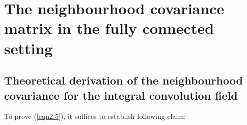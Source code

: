 \documentclass{article}
\begin{document}

\section{The neighbourhood covariance matrix in the fully connected setting\label{appendix.dd}}
\subsection{Theoretical derivation of the neighbourhood covariance for the integral convolution field}\label{appendix.B.1}
To prove (\ref{eqn2.5}), it suffices to establish following claim:
\end{document}
